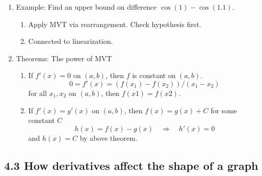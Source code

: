 \documentclass{article}
\begin{document}
\begin{enumerate}
\item Example: Find an upper bound on difference $\cos(1)-\cos(1.1)$.
\begin{enumerate}
\item Apply MVT via rearrangement. Check hypothesis first.
\item Connected to linearization.
\end{enumerate}

\item Theorems: The power of MVT
\begin{enumerate}
\item If $f'(x)=0$ on $(a,b)$, then $f$ is constant on $(a,b)$.
\[
0 = f'(x) = (f(x_1)-f(x_2))/(x_1-x_2)
\]
for all $x_1,x_2$ on $(a,b)$, then $f(x1)=f(x2)$.
\item If $f'(x)=g'(x)$ on $(a,b)$, then $f(x)=g(x)+C$ for some constant $C$
\[ 
h(x)=f(x)-g(x) \quad \Rightarrow \quad h'(x)=0
\]
and $h(x)=C$ by above theorem.
\end{enumerate}
\end{enumerate}


\subsection{4.3 How derivatives affect the shape of a graph}
\end{document}
